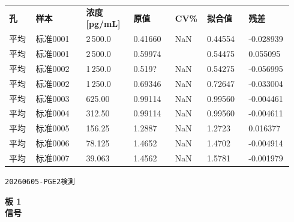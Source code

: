 \documentclass[UTF8,10pt,a4paper,fontset=fandol]{ctexart}
\begin{document}
\small
\begin{tabular}{p{0.09\linewidth}p{0.17\linewidth}p{0.16\linewidth}p{0.14\linewidth}p{0.10\linewidth}p{0.14\linewidth}p{0.14\linewidth}}
\textbf{孔} & \textbf{样本} & \textbf{浓度 [pg/mL]} & \textbf{原值} & \textbf{CV\%} & \textbf{拟合值} & \textbf{残差}\\
平均 & 标准0001 & 2\,500.0 & 0.41660 & NaN & 0.44554 & -0.028939\\
平均 & 标准0001 & 2\,500.0 & 0.59974 &  & 0.54475 & 0.055095\\
平均 & 标准0002 & 1\,250.0 & 0.519? & NaN & 0.54275 & -0.056995\\
平均 & 标准0002 & 1\,250.0 & 0.69346 & NaN & 0.72647 & -0.033004\\
平均 & 标准0003 & 625.00 & 0.99114 & NaN & 0.99560 & -0.004461\\
平均 & 标准0004 & 312.50 & 0.99114 & NaN & 0.99560 & -0.004611\\
平均 & 标准0005 & 156.25 & 1.2887 & NaN & 1.2723 & 0.016377\\
平均 & 标准0006 & 78.125 & 1.4652 & NaN & 1.4702 & -0.004914\\
平均 & 标准0007 & 39.063 & 1.4562 & NaN & 1.5781 & -0.001979\\
\end{tabular}
\normalsize

\newpage

\noindent\texttt{20260605-PGE2検測}\hfill{}

\medskip
\noindent\textbf{板 1}\\
\textbf{信号}
\end{document}
